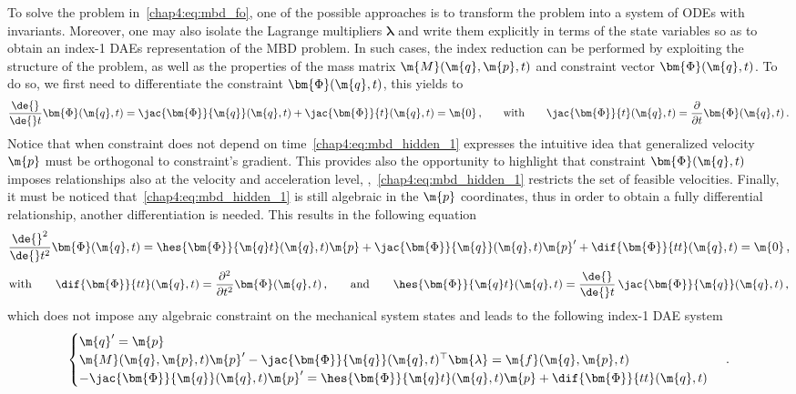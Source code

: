 To solve the problem in~\eqref{chap4:eq:mbd_fo}, one of the possible approaches is to transform the problem into a system of \acp{ODE} with invariants. Moreover, one may also isolate the Lagrange multipliers $\bm{\lambda}$ and write them explicitly in terms of the state variables so as to obtain an index-1 \acp{DAE} representation of the \ac{MBD} problem. In such cases, the index reduction can be performed by exploiting the structure of the problem, as well as the properties of the mass matrix $\m{M}(\m{q}, \m{p}, t)$ and constraint vector $\bm{\Phi}(\m{q}, t)$. To do so, we first need to differentiate the constraint $\bm{\Phi}(\m{q}, t)$, this yields to
%
\begin{equation}
  \dfrac{\de{}}{\de{} t}\bm{\Phi}(\m{q}, t) = \jac{\bm{\Phi}}{\m{q}}(\m{q}, t) + \jac{\bm{\Phi}}{t}(\m{q}, t) = \m{0}
  \, \text{,}
  \qquad \text{with} \qquad \jac{\bm{\Phi}}{t}(\m{q}, t) = \dfrac{\partial}{\partial t}\bm{\Phi}(\m{q}, t)
  \, \text{.}
  \label{chap4:eq:mbd_hidden_1}
\end{equation}
%
Notice that when constraint does not depend on time~\eqref{chap4:eq:mbd_hidden_1} expresses the intuitive idea that generalized velocity $\m{p}$ must be orthogonal to constraint's gradient. This provides also the opportunity to highlight that constraint $\bm{\Phi}(\m{q}, t)$ imposes relationships also at the velocity and acceleration level, \ie{},~\eqref{chap4:eq:mbd_hidden_1} restricts the set of feasible velocities. Finally, it must be noticed that~\eqref{chap4:eq:mbd_hidden_1} is still algebraic in the $\m{p}$ coordinates, thus in order to obtain a fully differential relationship, another differentiation is needed. This results in the following equation
%
\begin{equation}
  \dfrac{\de{}^2}{\de{}t^2}\bm{\Phi}(\m{q}, t) = \hes{\bm{\Phi}}{\m{q}t}(\m{q}, t)\m{p} + \jac{\bm{\Phi}}{\m{q}}(\m{q}, t)\m{p}^{\prime} + \dif{\bm{\Phi}}{tt}(\m{q}, t) = \m{0} \, \text{,}
  \label{chap4:eq:mbd_hidden_2}
\end{equation}
\begin{equation*}
  \text{with} \qquad
  \dif{\bm{\Phi}}{tt}(\m{q}, t) = \dfrac{\partial^2}{\partial t^2}\bm{\Phi}(\m{q}, t) \, \text{,}
  \qquad \text{and} \qquad
  \hes{\bm{\Phi}}{\m{q}t}(\m{q}, t) = \dfrac{\de{}}{\de{} t}\,\jac{\bm{\Phi}}{\m{q}}(\m{q}, t) \, \text{,}
\end{equation*}
%
which does not impose any algebraic constraint on the mechanical system states and leads to the following index-1 \ac{DAE} system
%
\begin{equation}
  \begin{cases}
    \m{q}^{\prime} = \m{p} \\
    \m{M}(\m{q}, \m{p}, t)\m{p}^{\prime} - \jac{\bm{\Phi}}{\m{q}}(\m{q}, t)^{\top}\bm{\lambda} = \m{f}(\m{q},\m{p},t) \\
    -\jac{\bm{\Phi}}{\m{q}}(\m{q}, t)\m{p}^{\prime} = \hes{\bm{\Phi}}{\m{q}t}(\m{q}, t)\m{p} + \dif{\bm{\Phi}}{tt}(\m{q}, t)
  \end{cases} \, \text{.}
  \label{chap4:eq:mbd_ode}
\end{equation}
